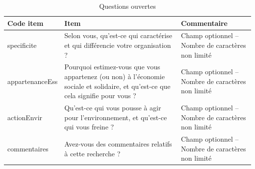 \begin{table}[h]
    \caption{Questions ouvertes}
    \label{table:questionsouvertes}
    \centering
    \begin{tabularx}{\linewidth}{|l|L|L|}
        \hline
        \textbf{Code item} & \textbf{Item} &	\textbf{Commentaire} \\ \hline
         
        specificite	&Selon vous, qu'est-ce qui caractérise et qui différencie votre organisation ?	&Champ optionnel – Nombre de caractères non limité \\ \hline
        
        appartenanceEss	&Pourquoi estimez-vous que vous appartenez (ou non) à l'économie sociale et solidaire, et qu'est-ce que cela signifie pour vous ?	&Champ optionnel – Nombre de caractères non limité \\ \hline
        
        actionEnvir	&Qu'est-ce qui vous pousse à agir pour l'environnement, et qu'est-ce qui vous freine ?	&Champ optionnel – Nombre de caractères non limité \\ \hline
        
        commentaires	&Avez-vous des commentaires relatifs à cette recherche ?	&Champ optionnel – Nombre de caractères non limité \\ \hline


    \end{tabularx}
    
\end{table}